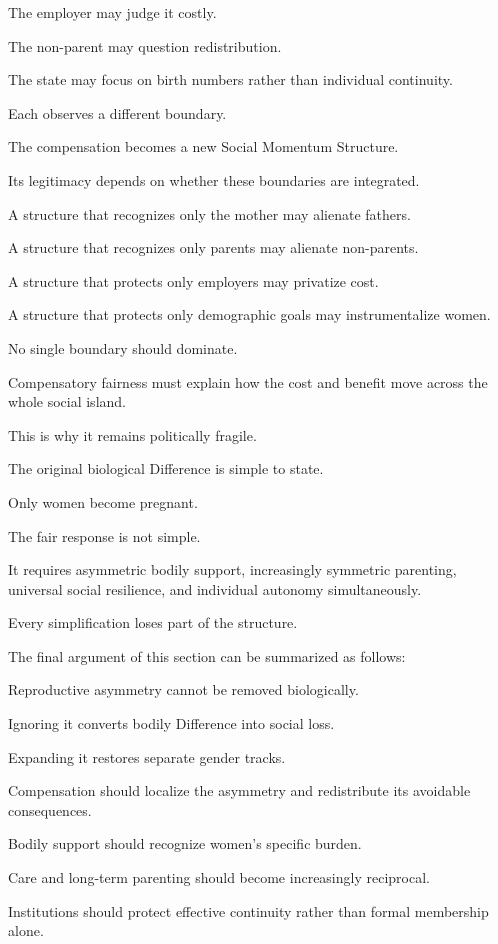 The employer may judge it costly.

The non-parent may question redistribution.

The state may focus on birth numbers rather than individual continuity.

Each observes a different boundary.

The compensation becomes a new Social Momentum Structure.

Its legitimacy depends on whether these boundaries are integrated.

A structure that recognizes only the mother may alienate fathers.

A structure that recognizes only parents may alienate non-parents.

A structure that protects only employers may privatize cost.

A structure that protects only demographic goals may instrumentalize women.

No single boundary should dominate.

Compensatory fairness must explain how the cost and benefit move across the whole social island.

This is why it remains politically fragile.

The original biological Difference is simple to state.

Only women become pregnant.

The fair response is not simple.

It requires asymmetric bodily support, increasingly symmetric parenting, universal social resilience, and individual autonomy simultaneously.

Every simplification loses part of the structure.

The final argument of this section can be summarized as follows:

Reproductive asymmetry cannot be removed biologically.

Ignoring it converts bodily Difference into social loss.

Expanding it restores separate gender tracks.

Compensation should localize the asymmetry and redistribute its avoidable consequences.

Bodily support should recognize women’s specific burden.

Care and long-term parenting should become increasingly reciprocal.

Institutions should protect effective continuity rather than formal membership alone.

